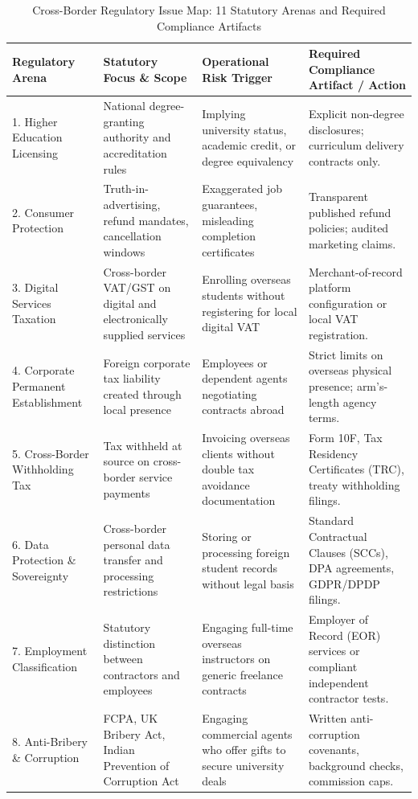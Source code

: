\begin{table}[t]
\centering
\small
\caption{Cross-Border Regulatory Issue Map: 11 Statutory Arenas and Required Compliance Artifacts}
\label{tab:cross_border_regulatory_map}
\begin{tabularx}{\textwidth}{p{3.2cm} p{3.4cm} p{3.2cm} X}
\toprule
\textbf{Regulatory Arena} & \textbf{Statutory Focus \& Scope} & \textbf{Operational Risk Trigger} & \textbf{Required Compliance Artifact / Action} \\
\midrule
1. Higher Education Licensing & National degree-granting authority and accreditation rules & Implying university status, academic credit, or degree equivalency & Explicit non-degree disclosures; curriculum delivery contracts only. \\
2. Consumer Protection & Truth-in-advertising, refund mandates, cancellation windows & Exaggerated job guarantees, misleading completion certificates & Transparent published refund policies; audited marketing claims. \\
3. Digital Services Taxation & Cross-border VAT/GST on digital and electronically supplied services & Enrolling overseas students without registering for local digital VAT & Merchant-of-record platform configuration or local VAT registration. \\
4. Corporate Permanent Establishment & Foreign corporate tax liability created through local presence & Employees or dependent agents negotiating contracts abroad & Strict limits on overseas physical presence; arm's-length agency terms. \\
5. Cross-Border Withholding Tax & Tax withheld at source on cross-border service payments & Invoicing overseas clients without double tax avoidance documentation & Form 10F, Tax Residency Certificates (TRC), treaty withholding filings. \\
6. Data Protection \& Sovereignty & Cross-border personal data transfer and processing restrictions & Storing or processing foreign student records without legal basis & Standard Contractual Clauses (SCCs), DPA agreements, GDPR/DPDP filings. \\
7. Employment Classification & Statutory distinction between contractors and employees & Engaging full-time overseas instructors on generic freelance contracts & Employer of Record (EOR) services or compliant independent contractor tests. \\
8. Anti-Bribery \& Corruption & FCPA, UK Bribery Act, Indian Prevention of Corruption Act & Engaging commercial agents who offer gifts to secure university deals & Written anti-corruption covenants, background checks, commission caps. \\

\end{tabularx}
\end{table}
